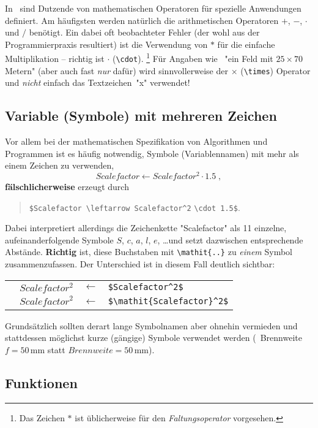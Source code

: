 In \latex\ sind Dutzende von mathematischen Operatoren für spezielle
Anwendungen definiert. Am häufigsten werden natürlich die arithmetischen
Operatoren $+$, $-$, $\cdot$ und $/$ benötigt. Ein dabei oft beobachteter
Fehler (der wohl aus der Programmierpraxis resultiert) ist die Verwendung von
$*$ für die einfache Multiplikation -- richtig ist $\cdot$ (\verb!\cdot!).%
\footnote{Das Zeichen $*$ ist üblicherweise für den \emph{Faltungsoperator}
vorgesehen.}
%
Für Angaben wie \zB\ "ein Feld mit $25 \times 70$ Metern" (aber auch fast
\emph{nur} dafür) wird sinnvollerweise der $\times$ (\verb!\times!) Operator
und \emph{nicht} einfach das Textzeichen~"x" verwendet!


\subsection{Variable (Symbole) mit mehreren Zeichen}

Vor allem bei der mathematischen Spezifikation von Algorithmen und Programmen
ist es häufig notwendig, Symbole (Variablennamen) mit mehr als einem Zeichen
zu verwenden, \zB
%
	\[Scalefactor\leftarrow Scalefactor^2 \cdot 1.5 \; ,\]
%
\textbf{fälschlicherweise} erzeugt durch
%
\begin{quote}
	\verb!$Scalefactor \leftarrow Scalefactor^2! \verb!\cdot 1.5$!.
\end{quote}
%
Dabei interpretiert \latex allerdings die Zeichenkette "Scalefactor" als 11
einzelne, aufeinanderfolgende Symbole $S$, $c$, $a$, $l$, $e$, \ldots und
setzt dazwischen entsprechende Abstände. \textbf{Richtig} ist, diese
Buchstaben mit \verb!\mathit{..}! zu \emph{einem} Symbol zusammenzufassen.
Der Unterschied ist in diesem Fall deutlich sichtbar:
%
\begin{center}
	\setlength{\tabcolsep}{4pt}
	\begin{tabular}{llll}
		\text{Falsch:}  & $Scalefactor^2$          & $\leftarrow$ &
		\verb!$Scalefactor^2$!          \\
		\text{Richtig:} & $\mathit{Scalefactor}^2$ & $\leftarrow$ &
		\verb!$\mathit{Scalefactor}^2$!
	\end{tabular}
\end{center}
%
Grundsätzlich sollten derart lange Symbolnamen aber ohnehin vermieden und
stattdessen möglichst kurze (gängige) Symbole verwendet werden (\zB\
Brennweite $f = 50 \, \mathrm{mm}$ statt $\mathit{Brennweite} = 50 \,
\mathrm{mm}$).

\subsection{Funktionen}

